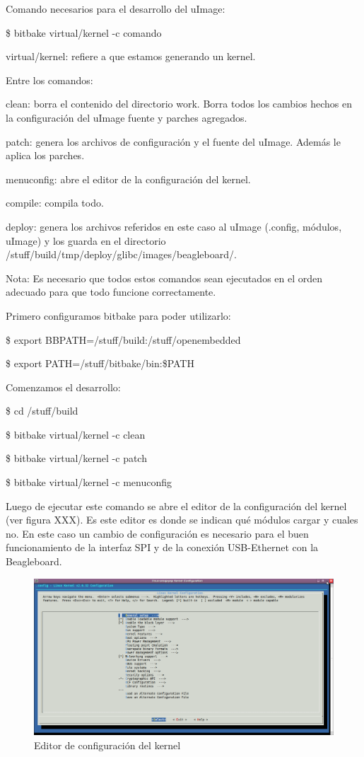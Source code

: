 Comando necesarios para el desarrollo del uImage:

\$ bitbake virtual/kernel -c comando

virtual/kernel: refiere a que estamos generando un kernel.

Entre los comandos:

clean: borra el contenido del directorio work. Borra todos los cambios hechos en la configuración del uImage fuente y parches agregados.

patch: genera los archivos de configuración y el fuente del uImage. Además le aplica los parches.

menuconfig: abre el editor de la configuración del kernel.

compile: compila todo.

deploy: genera los archivos referidos en este caso al uImage (.config, módulos, uImage) y los guarda en el directorio /stuff/build/tmp/deploy/glibc/images/beagleboard/.

Nota: Es necesario que todos estos comandos sean ejecutados en el orden adecuado para que todo funcione correctamente.

Primero configuramos bitbake para poder utilizarlo:

\$ export BBPATH=/stuff/build:/stuff/openembedded

\$ export PATH=/stuff/bitbake/bin:\$PATH

Comenzamos el desarrollo:

\$ cd /stuff/build

\$ bitbake virtual/kernel -c clean

\$ bitbake virtual/kernel -c patch

\$ bitbake virtual/kernel -c menuconfig


Luego de ejecutar este comando se abre el editor de la configuración del kernel (ver figura XXX). Es este editor es donde se indican qué módulos cargar y cuales no. En este caso un cambio de  configuración es necesario para el buen funcionamiento de la interfaz SPI y de la conexión USB-Ethernet con la Beagleboard.

\begin{figure}[H]
\centering
  \begin{center}
  \includegraphics[scale=.3]{Imagenes/kernel.png} 
  \end{center}
  \caption{Editor de configuración del kernel}\label{Fig:HW} 
\end{figure}

